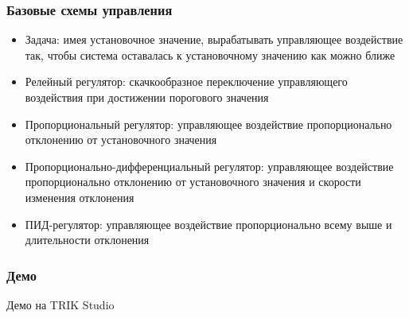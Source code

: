 \documentclass{../../slides-style}
\begin{document}
    \begin{frame}
        \frametitle{Базовые схемы управления}
        \begin{itemize}
            \item Задача: имея установочное значение, вырабатывать управляющее воздействие так, чтобы система оставалась к установочному значению как можно ближе
            \item Релейный регулятор: скачкообразное переключение управляющего воздействия при достижении порогового значения
            \item Пропорциональный регулятор: управляющее воздействие пропорционально отклонению от установочного значения
            \item Пропорционально-дифференциальный регулятор: управляющее воздействие пропорционально отклонению от установочного значения и скорости изменения отклонения
            \item ПИД-регулятор: управляющее воздействие пропорционально всему выше и длительности отклонения
        \end{itemize}
    \end{frame}

    \begin{frame}
        \frametitle{Демо}
        \begin{center}
            \Huge{Демо на TRIK Studio}
        \end{center}
    \end{frame}
\end{document}
